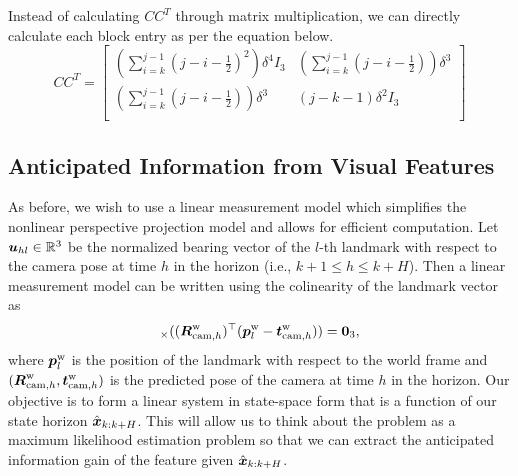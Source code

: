 Instead of calculating $CC^T$ through matrix multiplication, we can directly calculate each block entry as per the equation below.
\[CC^T =
\begin{bmatrix}
(\sum_{i=k}^{j-1}(j-i-\frac{1}{2})^2)\delta^4 I_3 & (\sum_{i=k}^{j-1}(j-i-\frac{1}{2}))\delta^3 \\
(\sum_{i=k}^{j-1}(j-i-\frac{1}{2}))\delta^3  &
(j-k-1)\delta^2I_3 \\
\end{bmatrix}
\]
\subsection{Anticipated Information from Visual Features}\label{sub:info_features}

As before, we wish to use a linear measurement model which simplifies the nonlinear perspective projection model and allows for efficient computation.
Let $\boldsymbol u_{hl}\in\mathbb{R}^3$ be the normalized bearing vector of the $l$-th landmark with respect to the camera pose at time $h$ in the horizon (i.e., $k+1\le h\le k+H$).
Then a linear measurement model can be written using the colinearity of the landmark vector as
\begin{equation}
[\uhl]_\times((\RWCh)^\top(\pWL-\tWCh)) = \boldsymbol 0_3,
\end{equation}
where $\boldsymbol p^\text{w}_l$ is the position of the landmark with respect to the world frame and $(\boldsymbol R^\text{w}_{\text{cam},h},\boldsymbol t^\text{w}_{\text{cam},h})$ is the predicted pose of the camera at time $h$ in the horizon.
Our objective is to form a linear system in state-space form that is a function of our state horizon $\hat{\boldsymbol x}_{k:k+H}$.
This will allow us to think about the problem as a maximum likelihood estimation problem so that we can extract the anticipated information gain of the feature given $\hat{\boldsymbol x}_{k:k+H}$.


